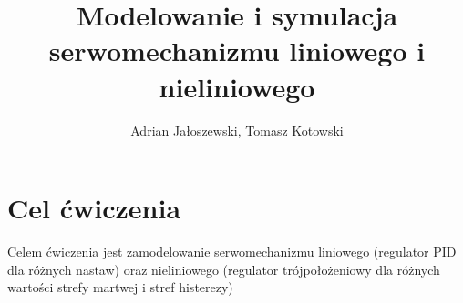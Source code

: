 \documentclass[a4paper, 12pt, titlepage]{article}
\title{Modelowanie i symulacja serwomechanizmu liniowego i nieliniowego}
\author{Adrian Jałoszewski, Tomasz Kotowski}
\date{}
\begin{document}
	\maketitle
	\section{Cel ćwiczenia}
		Celem ćwiczenia jest zamodelowanie serwomechanizmu liniowego (regulator PID dla różnych nastaw) oraz nieliniowego (regulator trójpołożeniowy dla różnych wartości strefy martwej i stref histerezy)
	
\end{document}
